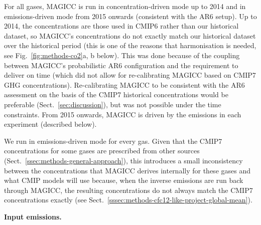 For all gases, MAGICC is run in concentration-driven mode up to 2014 and in emissions-driven mode from 2015 onwards
(consistent with the AR6 setup).
Up to 2014, the concentrations are those used in CMIP6 \citep{meinshausen_historical-ghgs_2017,nicholls_rcmip_2020}
rather than our historical dataset,
so MAGICC's concentrations do not exactly match our historical dataset over the historical period
(this is one of the reasons that harmonisation is needed, see Fig.~\ref{fig:methods-co2}a, b below).
This was done because of the coupling between MAGICC's probabilistic AR6 configuration
and the requirement to deliver on time (which did not allow for re-calibrating MAGICC based on CMIP7 GHG concentrations).
Re-calibrating MAGICC to be consistent with the AR6 assessment on the basis of the CMIP7 historical concentrations
would be preferable (Sect.~\ref{sec:discussion}), but was not possible under the time constraints.
From 2015 onwards, MAGICC is driven by the emissions in each experiment (described below).

We run in emissions-driven mode for every gas.
Given that the CMIP7 concentrations for some gases are prescribed from other sources (Sect.~\ref{ssec:methods-general-approach}),
this introduces a small inconsistency between the concentrations that MAGICC derives internally for these gases and what CMIP models will use because,
when the inverse emissions are run back through MAGICC,
the resulting concentrations do not always match the CMIP7 concentrations exactly
(see Sect.~\ref{sssec:methods-cfc12-like-project-global-mean}).

\textbf{Input emissions.}


